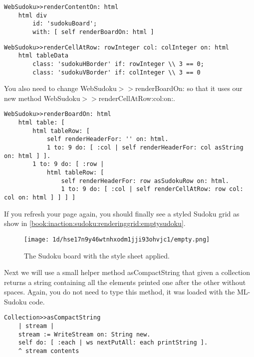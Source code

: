 \documentclass[a4paper,10pt,twoside]{book}
\newcommand{\ct}[1]{{\small\ttfamily\textup{#1}}}
\begin{document}
\begin{lstlisting}
WebSudoku>>renderContentOn: html
    html div
        id: 'sudokuBoard';
        with: [ self renderBoardOn: html ]
\end{lstlisting}

\begin{lstlisting}
WebSudoku>>renderCellAtRow: rowInteger col: colInteger on: html
    html tableData
        class: 'sudokuHBorder' if: rowInteger \\ 3 == 0;
        class: 'sudokuVBorder' if: colInteger \\ 3 == 0
\end{lstlisting}

You also need to change \ct{WebSudoku$>$$>$renderBoardOn:} so that it uses our new method \ct{WebSudoku$>$$>$renderCellAtRow:col:on:}.

\begin{lstlisting}
WebSudoku>>renderBoardOn: html
    html table: [
        html tableRow: [ 
            self renderHeaderFor: '' on: html.
            1 to: 9 do: [ :col | self renderHeaderFor: col asString on: html ] ].
        1 to: 9 do: [ :row |
            html tableRow: [
                self renderHeaderFor: row asSudokuRow on: html.
                1 to: 9 do: [ :col | self renderCellAtRow: row col: col on: html ] ] ] ]
\end{lstlisting}

If you refresh your page again, you should finally see a styled Sudoku grid as show in \autoref{book:inaction:sudoku:renderinggrid:emptysudoku}.

\begin{figure}[h!tbp]
	\begin{center}
		\texttt{[image: 1d/hse17n9y46wtnhxodm1jji93ohvjc1/empty.png]}
		\caption{The Sudoku board with the style sheet applied.\label{book:inaction:sudoku:renderinggrid:emptysudoku}}
	\end{center}
\end{figure}


Next we will use a small helper method \ct{asCompactString} that given a collection returns a string containing all the elements printed one after the other without spaces. Again, you do not need to type this method, it was loaded with the ML-Sudoku code.

\begin{lstlisting}
Collection>>asCompactString
    | stream |
    stream := WriteStream on: String new.
    self do: [ :each | ws nextPutAll: each printString ].
    ^ stream contents
\end{lstlisting}
\end{document}
